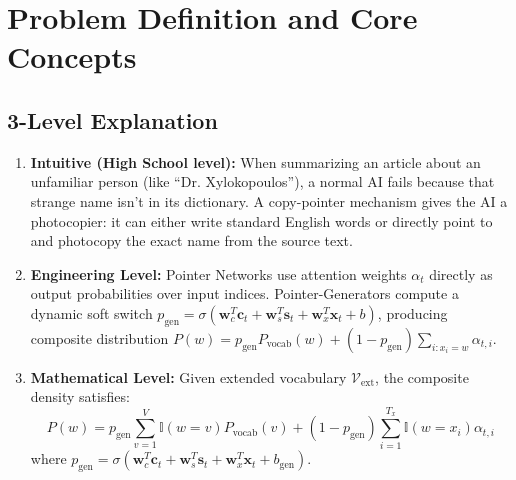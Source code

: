 \documentclass[11pt,a4paper]{article}
\theoremstyle{definition}
\begin{document}
\section{Problem Definition and Core Concepts}

\subsection{3-Level Explanation}
\begin{enumerate}
    \item \textbf{Intuitive (High School level):} When summarizing an article about an unfamiliar person (like ``Dr. Xylokopoulos''), a normal AI fails because that strange name isn't in its dictionary. A copy-pointer mechanism gives the AI a photocopier: it can either write standard English words or directly point to and photocopy the exact name from the source text.
    \item \textbf{Engineering Level:} Pointer Networks use attention weights $\alpha_t$ directly as output probabilities over input indices. Pointer-Generators compute a dynamic soft switch $p_{\text{gen}} = \sigma(\mathbf{w}_c^T \mathbf{c}_t + \mathbf{w}_s^T \mathbf{s}_t + \mathbf{w}_x^T \mathbf{x}_t + b)$, producing composite distribution $P(w) = p_{\text{gen}} P_{\text{vocab}}(w) + (1 - p_{\text{gen}}) \sum_{i: x_i = w} \alpha_{t, i}$.
    \item \textbf{Mathematical Level:} Given extended vocabulary $\mathcal{V}_{\text{ext}}$, the composite density satisfies:
    \begin{equation}
    P(w) = p_{\text{gen}} \sum_{v=1}^V \mathbb{I}(w = v) P_{\text{vocab}}(v) + (1 - p_{\text{gen}}) \sum_{i=1}^{T_x} \mathbb{I}(w = x_i) \alpha_{t, i}
    \end{equation}
    where $p_{\text{gen}} = \sigma(\mathbf{w}_c^T \mathbf{c}_t + \mathbf{w}_s^T \mathbf{s}_t + \mathbf{w}_x^T \mathbf{x}_t + b_{\text{gen}})$.
\end{enumerate}
\end{document}
